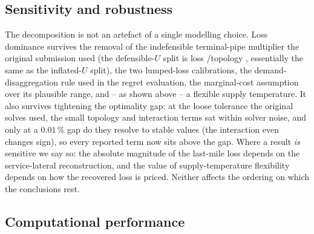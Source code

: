 \documentclass[a4paper,fleqn]{cas-dc}
\begin{document}
\subsection{Sensitivity and robustness}
The decomposition is not an artefact of a single modelling choice. Loss dominance survives the
removal of the indefensible terminal-pipe multiplier the original submission used (the
defensible-$U$ split is loss /topology , essentially the same
as the inflated-$U$ split), the two lumped-loss calibrations, the demand-disaggregation rule
used in the regret evaluation, the marginal-cost assumption over its plausible range, and -- as
shown above -- a flexible supply temperature. It also survives tightening the optimality gap:
at the loose tolerance the original solves used, the small topology and interaction terms sat
within solver noise, and only at a $0.01$\,\% gap do they resolve to stable values (the
interaction even changes sign), so every reported term now sits above the gap. Where a result
\emph{is} sensitive we say so: the absolute magnitude of the last-mile loss depends on the
service-lateral reconstruction, and the value of supply-temperature flexibility depends on how
the recovered loss is priced. Neither affects the ordering on which the conclusions rest.



\subsection{Computational performance}

\end{document}
